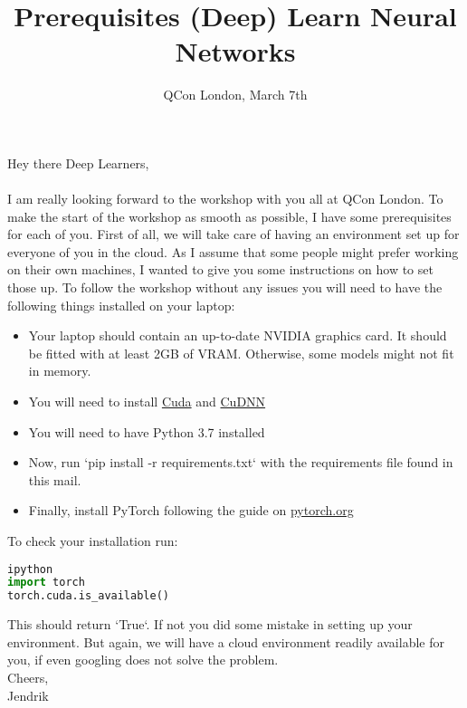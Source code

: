 


\title{Prerequisites (Deep) Learn Neural Networks}
\author{}
\date{QCon London, March 7th}



Hey there Deep Learners, \\
\\
I am really looking forward to the workshop with you all at QCon London.
To make the start of the workshop as smooth as possible, I have some prerequisites for each of you. First of all, we will take care of having an environment set up for everyone of you in the cloud. As I assume that some people might prefer working on their own machines, I wanted to give you some instructions on how to set those up. To follow the workshop without any issues you will need to have the following things installed on your laptop:
\begin{itemize}
	\item Your laptop should contain an up-to-date NVIDIA graphics card. It should be fitted with at least 2GB of VRAM. Otherwise, some models might not fit in memory.
	\item{You will need to install   \href{https://developer.nvidia.com/cuda-downloads}{Cuda} and \href{https://developer.nvidia.com/cudnn}{CuDNN}}
	\item You will need to have Python 3.7 installed
	\item Now, run `pip install -r requirements.txt` with the requirements file found in this mail.
	\item{Finally, install PyTorch following the guide on \href{pytorch.org}{pytorch.org}}
\end{itemize}
To check your installation run:\\
\begin{lstlisting}[language=Python]
ipython
import torch
torch.cuda.is_available()
\end{lstlisting}
This should return `True`.
If not you did some mistake in setting up your environment. But again, we will have a cloud environment readily available for you, if even googling does not solve the problem.\\

Cheers,\\
Jendrik



